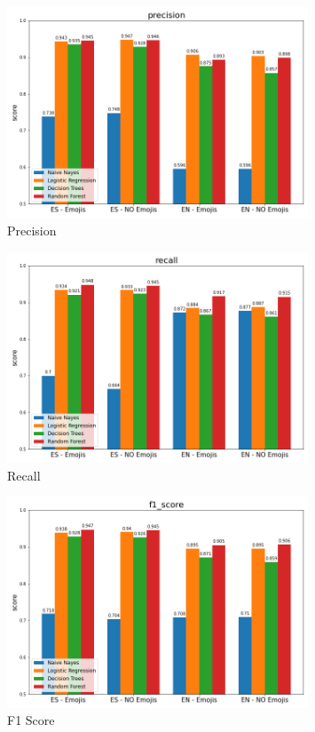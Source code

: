 \begin{figure}
    \centering
    \includegraphics[width=0.8\textwidth]{results/mourning_tweets_precision.png}
    \caption{Precision}
    \label{fig:mt_precision}
\end{figure}


\begin{figure}
    \centering
    \includegraphics[width=0.8\textwidth]{results/mourning_tweets_recall.png}
    \caption{Recall}
    \label{fig:mt_recall}
\end{figure}


\begin{figure}
    \centering
    \includegraphics[width=0.8\textwidth]{results/mourning_tweets_f1_score.png}
    \caption{F1 Score}
    \label{fig:mt_f1score}
\end{figure}

